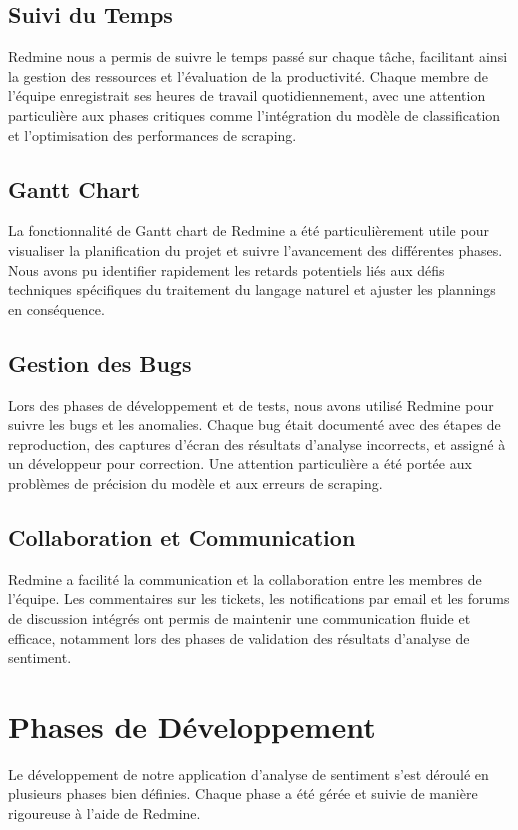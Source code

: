 \subsection{Suivi du Temps}
Redmine nous a permis de suivre le temps passé sur chaque tâche, facilitant ainsi la gestion des ressources et l'évaluation de la productivité. Chaque membre de l'équipe enregistrait ses heures de travail quotidiennement, avec une attention particulière aux phases critiques comme l'intégration du modèle de classification et l'optimisation des performances de scraping.

\subsection{Gantt Chart}
La fonctionnalité de Gantt chart de Redmine a été particulièrement utile pour visualiser la planification du projet et suivre l'avancement des différentes phases. Nous avons pu identifier rapidement les retards potentiels liés aux défis techniques spécifiques du traitement du langage naturel et ajuster les plannings en conséquence.

\subsection{Gestion des Bugs}
Lors des phases de développement et de tests, nous avons utilisé Redmine pour suivre les bugs et les anomalies. Chaque bug était documenté avec des étapes de reproduction, des captures d'écran des résultats d'analyse incorrects, et assigné à un développeur pour correction. Une attention particulière a été portée aux problèmes de précision du modèle et aux erreurs de scraping.

\subsection{Collaboration et Communication}
Redmine a facilité la communication et la collaboration entre les membres de l'équipe. Les commentaires sur les tickets, les notifications par email et les forums de discussion intégrés ont permis de maintenir une communication fluide et efficace, notamment lors des phases de validation des résultats d'analyse de sentiment.

\section{Phases de Développement}
Le développement de notre application d'analyse de sentiment s'est déroulé en plusieurs phases bien définies. Chaque phase a été gérée et suivie de manière rigoureuse à l'aide de Redmine.

